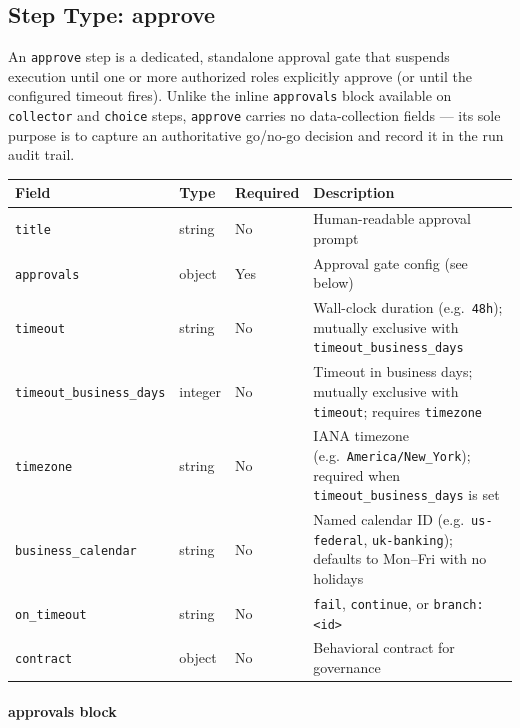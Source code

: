 \subsection{Step Type: approve}
\label{subsec:step-approve}

An \texttt{approve} step is a dedicated, standalone approval gate that suspends
execution until one or more authorized roles explicitly approve (or until the
configured timeout fires).  Unlike the inline \texttt{approvals} block available
on \texttt{collector} and \texttt{choice} steps, \texttt{approve} carries no
data-collection fields --- its sole purpose is to capture an authoritative
go/no-go decision and record it in the run audit trail.

\begin{center}
\begin{tabular}{lllp{4.8cm}}
\hline
\textbf{Field} & \textbf{Type} & \textbf{Required} & \textbf{Description} \\
\hline
\texttt{title}                    & string  & No  & Human-readable approval prompt \\
\texttt{approvals}                & object  & Yes & Approval gate config (see below) \\
\texttt{timeout}                  & string  & No  & Wall-clock duration (e.g.\ \texttt{48h}); mutually exclusive with \texttt{timeout\_business\_days} \\
\texttt{timeout\_business\_days}  & integer & No  & Timeout in business days; mutually exclusive with \texttt{timeout}; requires \texttt{timezone} \\
\texttt{timezone}                 & string  & No  & IANA timezone (e.g.\ \texttt{America/New\_York}); required when \texttt{timeout\_business\_days} is set \\
\texttt{business\_calendar}       & string  & No  & Named calendar ID (e.g.\ \texttt{us-federal}, \texttt{uk-banking}); defaults to Mon--Fri with no holidays \\
\texttt{on\_timeout}              & string  & No  & \texttt{fail}, \texttt{continue}, or \texttt{branch:<id>} \\
\texttt{contract}                 & object  & No  & Behavioral contract for governance \\
\hline
\end{tabular}
\end{center}

\paragraph{approvals block}

